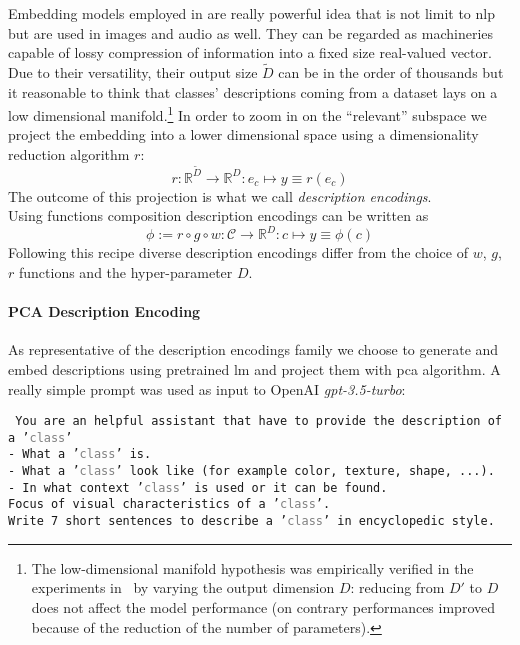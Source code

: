 Embedding models employed in  are really powerful idea
that is not limit to \acrshort{nlp} but are used in images and audio as well.
They can be regarded as machineries capable of lossy compression of information
into a fixed size real-valued vector. Due to their versatility, their output
size $\tilde{D}$ can be in the order of thousands but it reasonable to think
that classes' descriptions coming from a dataset lays on a low dimensional
manifold.\footnote{The low-dimensional manifold hypothesis was empirically
  verified in the experiments in~ by varying the
output dimension $D$: reducing from $D'$ to $D$ does not affect the model
performance (on contrary performances improved because of the reduction of the
number of parameters).} In order to zoom in on the ``relevant'' subspace we
project the embedding into a lower dimensional space using a dimensionality
reduction algorithm $r$:
\begin{equation}
  r : \mathbb{R}^{\tilde{D}} \to \mathbb{R}^{D} :
  e_c \mapsto y \equiv r(e_c)
  \label{eq:embedding-projection}
\end{equation}
The outcome of this projection is what we call \emph{description
encodings}.\\

Using functions composition description encodings can be written as
\begin{equation}
  \phi := r \circ g \circ w : \mathcal{C} \to \mathbb{R}^{D} :
  c \mapsto y \equiv \phi(c)
  \label{eq:desc-encoding}
\end{equation}
Following this recipe diverse description encodings differ from the choice of
$w$, $g$, $r$  functions and the hyper-parameter $D$.

\paragraph{PCA Description Encoding}\label{par:encoding-desc} As representative
of the description encodings family we choose to generate and embed descriptions
using pretrained \acrshort{lm} and project them with \acrfull{pca} algorithm. A
really simple prompt was used as input to OpenAI \emph{gpt-3.5-turbo}:

\vspace{10pt}

\begin{minipage}{0.9\linewidth}
\texttt{\small
You are an helpful assistant that have to provide the description of a
'\textcolor{gray}{\texttt{class}}'\\
- What a '\textcolor{gray}{\texttt{class}}' is.\\
- What a '\textcolor{gray}{\texttt{class}}' look like (for example color,
texture, shape, ...).\\
- In what context '\textcolor{gray}{\texttt{class}}' is used or it can be
found.\\
Focus of visual characteristics of a '\textcolor{gray}{\texttt{class}}'.\\
Write 7 short sentences to describe a '\textcolor{gray}{\texttt{class}}' in
encyclopedic style.
}
\end{minipage}

